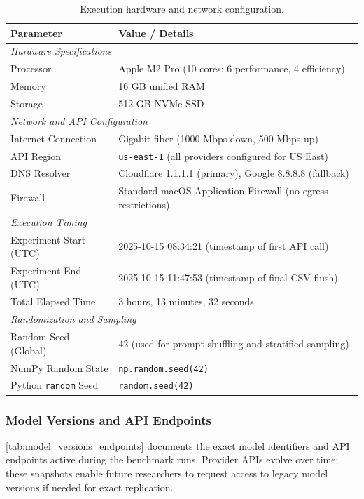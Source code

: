 \begin{table}[h!]
\centering
\caption{Execution hardware and network configuration.\label{tab:execution_context}}
\begin{tabularx}{\textwidth}{@{}l X@{}}
\toprule
\textbf{Parameter} & \textbf{Value / Details} \\
\midrule
\multicolumn{2}{l}{\textit{Hardware Specifications}} \\
Processor & Apple M2 Pro (10 cores: 6 performance, 4 efficiency) \\
Memory & 16 GB unified RAM \\
Storage & 512 GB NVMe SSD \\
\midrule
\multicolumn{2}{l}{\textit{Network and API Configuration}} \\
Internet Connection & Gigabit fiber (1000 Mbps down, 500 Mbps up) \\
API Region & \texttt{us-east-1} (all providers configured for US East) \\
DNS Resolver & Cloudflare 1.1.1.1 (primary), Google 8.8.8.8 (fallback) \\
Firewall & Standard macOS Application Firewall (no egress restrictions) \\
\midrule
\multicolumn{2}{l}{\textit{Execution Timing}} \\
Experiment Start (UTC) & 2025-10-15 08:34:21 (timestamp of first API call) \\
Experiment End (UTC) & 2025-10-15 11:47:53 (timestamp of final CSV flush) \\
Total Elapsed Time & 3 hours, 13 minutes, 32 seconds \\
\midrule
\multicolumn{2}{l}{\textit{Randomization and Sampling}} \\
Random Seed (Global) & 42 (used for prompt shuffling and stratified sampling) \\
NumPy Random State & \texttt{np.random.seed(42)} \\
Python \texttt{random} Seed & \texttt{random.seed(42)} \\
\bottomrule
\end{tabularx}
\end{table}

\subsubsection{Model Versions and API Endpoints}

\cref{tab:model_versions_endpoints} documents the exact model identifiers and API endpoints active during the benchmark runs. Provider APIs evolve over time; these snapshots enable future researchers to request access to legacy model versions if needed for exact replication.

